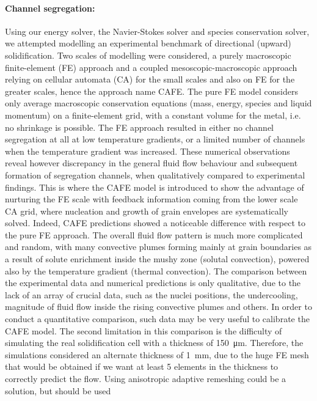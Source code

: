 \paragraph{Channel segregation:}
Using our energy solver, the Navier-Stokes solver and species conservation solver, we attempted modelling an experimental benchmark 
of directional (upward)  solidification. 
Two scales of modelling were considered, a purely macroscopic finite-element (FE) approach and a coupled mesoscopic-macroscopic approach
relying on cellular automata (CA) for the small scales and also on FE for the greater scales, hence the approach name CAFE. 
The pure FE model considers only average macroscopic conservation equations (mass, energy, species and liquid momentum) 
on a finite-element grid, with a constant volume for the metal, i.e. no shrinkage is possible. 
The FE approach resulted in either no channel segregation at all at low temperature gradients, or a limited number of channels when
the temperature gradient was increased. These numerical observations reveal however discrepancy in the general fluid flow behaviour and 
subsequent formation of segregation channels, when qualitatively compared to experimental findings.
This is where the CAFE model is introduced to show the advantage of nurturing the FE scale with feedback information coming from
the lower scale CA grid, where nucleation and growth of grain envelopes are systematically solved.
Indeed, CAFE predictions showed a noticeable difference with respect to the pure FE approach. The overall fluid flow pattern is 
much more complicated and random, with many convective plumes forming mainly at grain boundaries as a result of solute enrichment inside the mushy zone (solutal convection),
powered also by the temperature gradient (thermal convection).   
The comparison between the experimental data and numerical predictions is only qualitative, due to the lack of an array of crucial data, such 
as the nuclei positions, the undercooling, magnitude of fluid flow inside the rising convective plumes and others.
In order to conduct a quantitative comparison, such data may be very useful to calibrate the CAFE model.
The second limitation in this comparison is the difficulty of simulating the real solidification cell with a thickness of \SI{150}{\micro \metre}.
Therefore, the simulations considered an alternate thickness of \SI{1}{\milli \metre}, due to the huge FE mesh that would be obtained if
we want at least 5 elements in the thickness to correctly predict the flow. Using anisotropic adaptive remeshing could be a solution, but should be used
